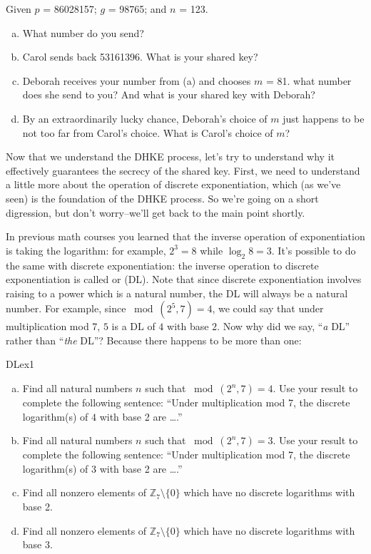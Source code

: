\begin{exer}
Given $p$ = 86028157; $g$ = 98765; and $n$ = 123.  
\begin{enumerate}[(a)]
\item	What number do you send?  

\item Carol sends back 53161396. What is your shared key? 

\item Deborah receives your number from (a) and chooses $m$ = 81. what number does she send to you? And what is your shared key with Deborah?

\item
By an extraordinarily lucky chance, Deborah's choice of $m$ just happens to be not too far from Carol's choice.  What is Carol's choice of $m$?

\end{enumerate}
\end{exer}
Now that we understand the DHKE process, let's try to understand why it effectively guarantees the secrecy of the shared key. First, we need to understand a little more about the operation of discrete exponentiation, which (as we've seen) is the foundation of the DHKE process. So we're going on a short digression, but don't worry--we'll get back to the main point shortly. 

In previous math courses you learned that the inverse operation of exponentiation is taking the logarithm: for example, $2^3 = 8$ while $\log_{2}8 = 3$.  It's possible to do the same with discrete exponentiation: the inverse operation to discrete exponentiation is  called  or (DL). Note that since discrete exponentiation involves raising to a power which is a natural number, the DL will always be a natural number.   For example, since $\bmod(2^5,7)=4$, we could say that under multiplication mod 7,  $5$ is a DL  of $4$ with base $2$. Now why did we say, ``\emph{a} DL'' rather than ``\emph{the} DL''? Because  there happens to be more than one:

\begin{exercise}{DLex1}
\begin{enumerate}[(a)]
\item
Find all natural numbers $n$ such that $\bmod(2^n,7)=4$.  Use your result to complete the following sentence: ``Under multiplication mod 7, the discrete logarithm(s) of $4$ with base 2  are \ldots.''
\item
Find all natural numbers $n$ such that $\bmod(2^n,7)=3$.  Use your result to complete the following sentence:  ``Under multiplication mod 7, the discrete logarithm(s) of $3$ with base 2 are \ldots.''
\item
Find all nonzero elements of $\mathbb{Z}_7 \setminus \{0\}$ which have no discrete logarithms with base 2.
\item
Find all nonzero elements of $\mathbb{Z}_7 \setminus \{0\}$ which have no discrete logarithms with base 3.
\end{enumerate}
\end{exercise}

